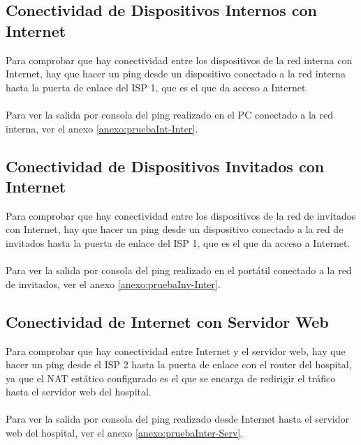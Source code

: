 \subsection{Conectividad de Dispositivos Internos con Internet}\label{subsec:ConHaciInt}
Para comprobar que hay conectividad entre los dispositivos de la red interna con Internet, hay que hacer un ping desde un dispositivo conectado a la red interna hasta la puerta de enlace del ISP 1, 
que es el que da acceso a Internet.
\\ \\ 
Para ver la salida por consola del ping realizado en el PC conectado a la red interna, ver el anexo \ref{anexo:pruebaInt-Inter}.

\subsection{Conectividad de Dispositivos Invitados con Internet}
Para comprobar que hay conectividad entre los dispositivos de la red de invitados con Internet, hay que hacer un ping desde un dispositivo conectado a la red de invitados hasta la puerta de enlace del ISP 1, 
que es el que da acceso a Internet.
\\ \\ 
Para ver la salida por consola del ping realizado en el portátil conectado a la red de invitados, ver el anexo \ref{anexo:pruebaInv-Inter}.

\subsection{Conectividad de Internet con Servidor Web}\label{subsec:ConDesdeInt}
Para comprobar que hay conectividad entre Internet y el servidor web, hay que hacer un ping desde el ISP 2 hasta la puerta de enlace con el router del hospital, ya que el NAT estático configurado es el que se encarga de redirigir el tráfico hasta el servidor web del hospital.
\\ \\ 
Para ver la salida por consola del ping realizado desde Internet hasta el servidor web del hospital, ver el anexo \ref{anexo:pruebaInter-Serv}.

